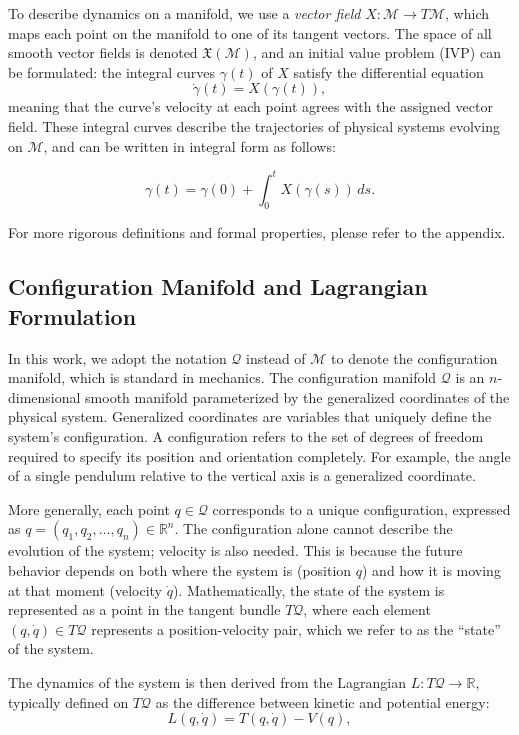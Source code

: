 \documentclass{article}
\theoremstyle{plain}
\theoremstyle{definition}
\theoremstyle{remark}
\begin{document}
To describe dynamics on a manifold, we use a \emph{vector field} $X : \mathcal{M} \to T\mathcal{M}$, which maps each point on the manifold to one of its tangent vectors. The space of all smooth vector fields is denoted $\mathfrak{X}(\mathcal{M})$, and an initial value problem (IVP) can be formulated: the integral curves $\gamma(t)$ of $X$ satisfy the differential equation
\[
\dot{\gamma}(t) = X(\gamma(t)),
\]
meaning that the curve's velocity at each point agrees with the assigned vector field. These integral curves describe the trajectories of physical systems evolving on $\mathcal{M}$, and can be written in integral form as follows:

\[
\gamma(t) = \gamma(0) + \int_0^t X(\gamma(s))\, ds.
\]

For more rigorous definitions and formal properties, please refer to the appendix.



\subsection{Configuration Manifold and Lagrangian Formulation}
In this work, we adopt the notation $\mathcal{Q}$ instead of $\mathcal{M}$ to denote the configuration manifold, which is standard in mechanics. 
The configuration manifold $\mathcal{Q}$ is an $n$-dimensional smooth manifold parameterized by the generalized coordinates of the physical system. 
Generalized coordinates are variables that uniquely define the system's configuration. 
A configuration refers to the set of degrees of freedom required to specify its position and orientation completely. For example, the angle of a single pendulum relative to the vertical axis is a generalized coordinate. 

More generally, each point $q \in \mathcal{Q}$ corresponds to a unique configuration, expressed as $q = (q_1, q_2, \dots, q_n) \in \mathbb{R}^n$. The configuration alone cannot describe the evolution of the system; velocity is also needed. 
This is because the future behavior depends on both where the system is (position $q$) and how it is moving at that moment (velocity $\dot{q}$). Mathematically, the state of the system is represented as a point in the tangent bundle $T\mathcal{Q}$, where each element $(q, \dot{q}) \in T\mathcal{Q}$ represents a position-velocity pair, which we refer to as the ``state'' of the system. 

The dynamics of the system is then derived from the Lagrangian $L : T\mathcal{Q} \rightarrow \mathbb{R}$, typically defined on $T\mathcal{Q}$ as the difference between kinetic and potential energy:
\begin{equation}
    \label{eq: lagrangian_form}
    L(q, \dot{q}) = T(q, \dot{q}) - V(q),
\end{equation}
\end{document}
